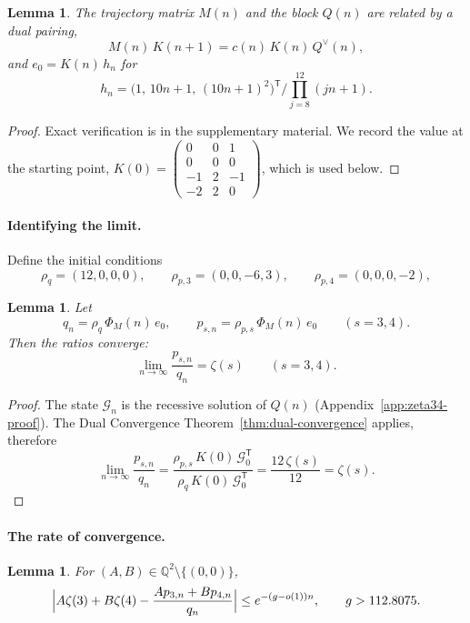 \documentclass[oneside,english,11pt]{amsart}
\newtheorem{lemma}[thm]{Lemma}
\begin{document}
\begin{lemma}\label{prop:z34-connection}
The trajectory matrix $M(n)$ and the block $Q(n)$ are related by a dual
pairing,
\[
  M(n)\,K(n+1)=c(n)\,K(n)\,Q^\vee(n),
\]
and $e_0=K(n)\,h_n$ for
\[
h_n=\bigl(1,\,10n+1,\,(10n+1)^2\bigr)^{\mathsf T}/\prod_{j=8}^{12}(jn+1).\]
\end{lemma}

\begin{proof}
Exact verification is in the supplementary material. We record the value at the starting point,
$K(0)=\left(\begin{smallmatrix}0&0&1\\0&0&0\\-1&2&-1\\-2&2&0\end{smallmatrix}\right)$,
which is used below.
\end{proof}

\paragraph{Identifying the limit.}
\label{subsubsec:z34-constants}

Define the initial conditions
\[
  \rho_q=(12,0,0,0),\qquad \rho_{p,3}=(0,0,-6,3),\qquad
  \rho_{p,4}=(0,0,0,-2),
\]
\begin{lemma}\label{lem:z34-limits}
Let
\[
  q_n=\rho_q\,\Phi_M(n)\,e_0,\qquad
    p_{s,n}=\rho_{p,s}\,\Phi_M(n)\,e_0\qquad(s=3,4).
\]
Then the ratios converge:
\[
  \lim_{n\to\infty}\frac{p_{s,n}}{q_n}=\zeta(s)\qquad(s=3,4).
\]
\end{lemma}

\begin{proof}
The state $\mathcal G_n$ is the recessive solution of $Q(n)$ (Appendix~\ref{app:zeta34-proof}).  The Dual Convergence Theorem~\ref{thm:dual-convergence} applies, therefore
\[
  \lim_{n\to\infty}\frac{p_{s,n}}{q_n}
  =\frac{\rho_{p,s}\,K(0)\,\mathcal G_0^{\mathsf T}}{\rho_q\,K(0)\,\mathcal G_0^{\mathsf T}}
  =\frac{12\,\zeta(s)}{12}=\zeta(s).
\]
\end{proof}

%
\paragraph{The rate of convergence.}
\label{subsubsec:z34-error}

\begin{lemma}\label{lem:z34-selected-error}
For $(A,B)\in\mathbb Q^2\setminus\{(0,0)\}$,
\[
  \Bigl|A\zeta(3)+B\zeta(4)-\frac{Ap_{3,n}+Bp_{4,n}}{q_n}\Bigr|
  \le e^{-(g-o(1))n},\qquad g>112.8075 .
\]
\end{lemma}
\end{document}
